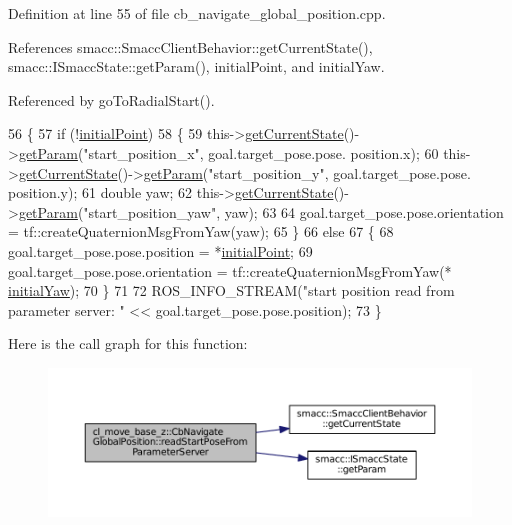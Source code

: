 Definition at line 55 of file cb\+\_\+navigate\+\_\+global\+\_\+position.\+cpp.



References smacc\+::\+Smacc\+Client\+Behavior\+::get\+Current\+State(), smacc\+::\+I\+Smacc\+State\+::get\+Param(), initial\+Point, and initial\+Yaw.



Referenced by go\+To\+Radial\+Start().


\begin{DoxyCode}
56 \{
57     \textcolor{keywordflow}{if} (!\hyperlink{classcl__move__base__z_1_1CbNavigateGlobalPosition_afc5b0337f06dc4c51026e0c0646b8645}{initialPoint})
58     \{
59         this->\hyperlink{classsmacc_1_1SmaccClientBehavior_abf6773e4dd948f932f11a346dd6e7c2c}{getCurrentState}()->\hyperlink{classsmacc_1_1ISmaccState_abbb3a24b912c6e8de28f7b86123b6357}{getParam}(\textcolor{stringliteral}{"start\_position\_x"}, goal.target\_pose.pose.
      position.x);
60         this->\hyperlink{classsmacc_1_1SmaccClientBehavior_abf6773e4dd948f932f11a346dd6e7c2c}{getCurrentState}()->\hyperlink{classsmacc_1_1ISmaccState_abbb3a24b912c6e8de28f7b86123b6357}{getParam}(\textcolor{stringliteral}{"start\_position\_y"}, goal.target\_pose.pose.
      position.y);
61         \textcolor{keywordtype}{double} yaw;
62         this->\hyperlink{classsmacc_1_1SmaccClientBehavior_abf6773e4dd948f932f11a346dd6e7c2c}{getCurrentState}()->\hyperlink{classsmacc_1_1ISmaccState_abbb3a24b912c6e8de28f7b86123b6357}{getParam}(\textcolor{stringliteral}{"start\_position\_yaw"}, yaw);
63 
64         goal.target\_pose.pose.orientation = tf::createQuaternionMsgFromYaw(yaw);
65     \}
66     \textcolor{keywordflow}{else}
67     \{
68         goal.target\_pose.pose.position = *\hyperlink{classcl__move__base__z_1_1CbNavigateGlobalPosition_afc5b0337f06dc4c51026e0c0646b8645}{initialPoint};
69         goal.target\_pose.pose.orientation = tf::createQuaternionMsgFromYaw(*
      \hyperlink{classcl__move__base__z_1_1CbNavigateGlobalPosition_a09f1cf00473ae1f90b974f49a1c31086}{initialYaw});
70     \}
71 
72     ROS\_INFO\_STREAM(\textcolor{stringliteral}{"start position read from parameter server: "} << goal.target\_pose.pose.position);
73 \}
\end{DoxyCode}


Here is the call graph for this function\+:
\nopagebreak
\begin{figure}[H]
\begin{center}
\leavevmode
\includegraphics[width=350pt]{classcl__move__base__z_1_1CbNavigateGlobalPosition_a868b25f238e3781c9a2e44b4e1502fcc_cgraph}
\end{center}
\end{figure}




